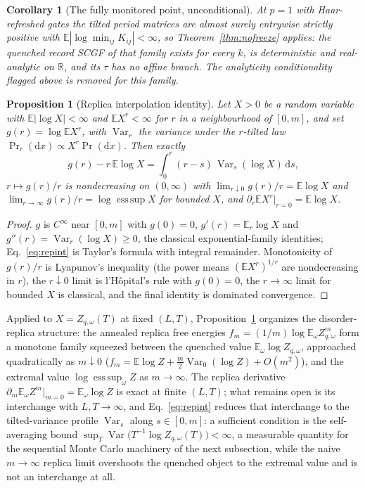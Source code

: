 \documentclass[aps,prx,reprint,superscriptaddress,nobibnotes,longbibliography]{revtex4-2}
\newtheorem{proposition}{Proposition}
\newtheorem{corollary}{Corollary}
\theoremstyle{remark}
\newcommand{\E}{\mathbb E}
\begin{document}
\begin{corollary}[The fully monitored point, unconditional]
\label{cor:p1closure}
At $p=1$ with Haar-refreshed gates the tilted period matrices are almost
surely entrywise strictly positive with
$\E|\log\min_{ij}K_{ij}|<\infty$, so
Theorem~\ref{thm:nofreeze} applies: the quenched record SCGF of that
family exists for every $k$, is deterministic and real-analytic on
$\mathbb R$, and its $\tau$ has no affine branch.  The analyticity
conditionality flagged above is removed for this family.
\end{corollary}

\begin{proposition}[Replica interpolation identity]
\label{prop:replica-int}
Let $X>0$ be a random variable with $\E|\log X|<\infty$ and $\E X^r<\infty$
for $r$ in a neighbourhood of $[0,m]$, and set $g(r)=\log\E X^r$, with
$\operatorname{Var}_r$ the variance under the $r$-tilted law $\Pr_r(\mathrm dx)\propto
X^r\Pr(\mathrm dx)$.  Then exactly
\begin{equation}
 g(r)-r\,\E\log X=\int_0^r (r-s)\,\operatorname{Var}_s(\log X)\,\mathrm ds,
 \label{eq:repint}
\end{equation}
$r\mapsto g(r)/r$ is nondecreasing on $(0,\infty)$ with
$\lim_{r\downarrow0}g(r)/r=\E\log X$ and
$\lim_{r\to\infty}g(r)/r=\log\operatorname*{ess\,sup}X$ for bounded $X$,
and $\partial_r\E X^r|_{r=0}=\E\log X$.
\end{proposition}

\begin{proof}
$g$ is $C^\infty$ near $[0,m]$ with $g(0)=0$, $g'(r)=\E_r\log X$ and
$g''(r)=\operatorname{Var}_r(\log X)\ge0$, the classical exponential-family identities;
Eq.~\eqref{eq:repint} is Taylor's formula with integral remainder.
Monotonicity of $g(r)/r$ is Lyapunov's inequality (the power means
$(\E X^r)^{1/r}$ are nondecreasing in $r$), the $r\downarrow0$ limit is
l'H\^opital's rule with $g(0)=0$, the $r\to\infty$ limit for bounded $X$
is classical, and the final identity is dominated convergence.
\end{proof}

Applied to $X=Z_{q,\omega}(T)$ at fixed $(L,T)$,
Proposition~\ref{prop:replica-int} organizes the disorder-replica
structure: the annealed replica free energies
$f_m=(1/m)\log\E_\omega Z_{q,\omega}^m$ form a monotone family squeezed
between the quenched value $\E_\omega\log Z_{q,\omega}$, approached
quadratically as $m\downarrow0$ ($f_m=\E\log Z+\tfrac m2\operatorname{Var}_0(\log Z)
+O(m^2)$), and the extremal value $\log\operatorname*{ess\,sup}_\omega Z$
as $m\to\infty$.  The replica derivative
$\partial_m\E_\omega Z^m|_{m=0}=\E_\omega\log Z$ is exact at finite
$(L,T)$; what remains open is its interchange with $L,T\to\infty$, and
Eq.~\eqref{eq:repint} reduces that interchange to the tilted-variance
profile $\operatorname{Var}_s$ along $s\in[0,m]$: a sufficient condition is the
self-averaging bound $\sup_{T}\operatorname{Var}\!\big(T^{-1}\log Z_{q,\omega}(T)\big)
<\infty$, a measurable quantity for the sequential Monte Carlo machinery
of the next subsection, while the naive $m\to\infty$ replica limit
overshoots the quenched object to the extremal value and is not an
interchange at all.
\end{document}
